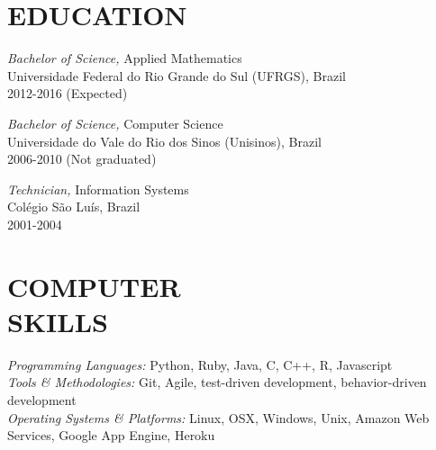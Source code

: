 \documentclass[line,margin]{res}
\begin{document}
\address{Porto Alegre, Rio Grande do Sul, Brazil}
\address{+55 51 8216 1084, fmagalhaes@gmail.com}
\address{GitHub: https://github.com/fabiogm}

\begin{resume}
 
\section{EDUCATION} {\sl Bachelor of Science,} Applied Mathematics \\
                Universidade Federal do Rio Grande do Sul (UFRGS), Brazil \\ 
                2012-2016 (Expected)

                   {\sl Bachelor of Science,} Computer Science \\
                Universidade do Vale do Rio dos Sinos (Unisinos), Brazil \\
                2006-2010 (Not graduated)

                   {\sl Technician,} Information Systems \\
                Colégio São Luís, Brazil \\
                2001-2004

 
\section{COMPUTER \\ SKILLS} {\sl Programming Languages:} Python, Ruby, Java, C, C++, R, Javascript\\
		{\sl Tools \& Methodologies:} Git, Agile, test-driven development, behavior-driven development\\
                {\sl Operating Systems \& Platforms:} Linux, OSX, Windows, Unix, Amazon Web Services, Google App Engine, Heroku
 

\end{resume}
\end{document}
